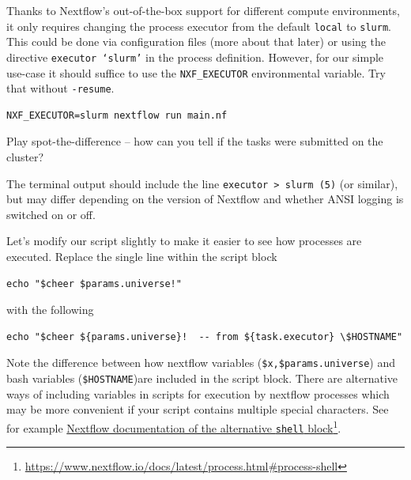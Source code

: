 Thanks to Nextflow's out-of-the-box support for different compute environments, 
it only requires changing the process executor from the default \texttt{local} to \texttt{slurm}.
This could be done via configuration files (more about that later) or using the directive \texttt{executor `slurm'} in the process definition. 
However, for our simple use-case it should suffice to use the \texttt{NXF\_EXECUTOR} environmental variable. Try that without \texttt{-resume}.


\begin{steps}
\begin{lstlisting}
NXF_EXECUTOR=slurm nextflow run main.nf
\end{lstlisting}
\end{steps}

\begin{questions}
Play spot-the-difference -- how can you tell if the tasks were submitted on the cluster?
\begin{answer}
The terminal output should include the line \texttt{executor >  slurm (5)} (or similar), 
but may differ depending on the version of Nextflow and whether ANSI logging is switched on or off.
\end{answer}
\end{questions}

\begin{steps}
Let's modify our script slightly to make it easier to see how processes are executed.
Replace the single line within the script block

\begin{verbatim}
echo "$cheer $params.universe!"
\end{verbatim}

with the following

\begin{verbatim}
echo "$cheer ${params.universe}!  -- from ${task.executor} \$HOSTNAME"
\end{verbatim}
\end{steps}


\begin{warning}
Note the difference between how nextflow variables (\texttt{\$x,\$params.universe}) and bash variables (\texttt{\$HOSTNAME})are included in the script block.
There are alternative ways of including variables in scripts for execution by nextflow processes which may be more convenient if your script contains multiple special characters. See for example \href{https://www.nextflow.io/docs/latest/process.html#process-shell}{Nextflow documentation of the alternative \texttt{shell} block}\footnote{\url{https://www.nextflow.io/docs/latest/process.html\#process-shell}}. 
\end{warning}

